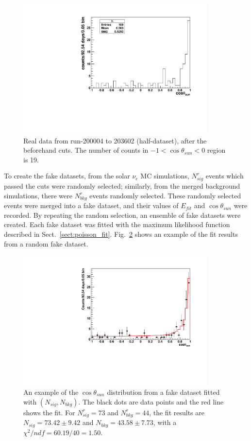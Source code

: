 \begin{figure}[!htb]
	\centering
	\includegraphics[width=10cm]{cosThetaToSun_halfData_5to15.pdf}
	\caption[Real data from run-200004 to 203602 (half-dataset), after the beforehand cuts.]{Real data from run-200004 to 203602 (half-dataset), after the beforehand cuts. The number of counts in $-1<\cos\theta_{sun}<0$ region is 19.}
	\label{half_data}
\end{figure}

To create the fake datasets, from the solar $\nu_e$ MC simulations, $N^r_{sig}$ events which passed the cuts were randomly selected; similarly, from the merged background simulations, there were $N^r_{bkg}$ events randomly selected. These randomly selected events were merged into a fake dataset, and their values of $E_{fit}$ and $\cos\theta_{sun}$ were recorded.
By repeating the random selection, an ensemble of fake datasets were created. Each fake dataset was fitted with the maximum likelihood function described in Sect.~\ref{sect:poisson_fit}. Fig.~\ref{ensemble_test} shows an example of the fit results from a random fake dataset.

\begin{figure}[!htb]
	\centering
	\includegraphics[width=10cm]{ensemble_fitExample.pdf}
	\caption[An example of the $\cos\theta_{sun}$ distribution from a fake dataset fitted with $(N_{sig},N_{bkg})$.]{An example of the $\cos\theta_{sun}$ distribution from a fake dataset fitted with $(N_{sig},N_{bkg})$. The black dots are data points and the red line shows the fit. For $N^r_{sig} = 73$ and $N^r_{bkg}=44$, the fit results are $N_{sig} = 73.42\pm9.42$ and $N_{bkg} = 43.58 \pm 7.73$, with a $\chi^2/ndf = 60.19/40 = 1.50$.}
	\label{ensemble_test}
\end{figure} 

